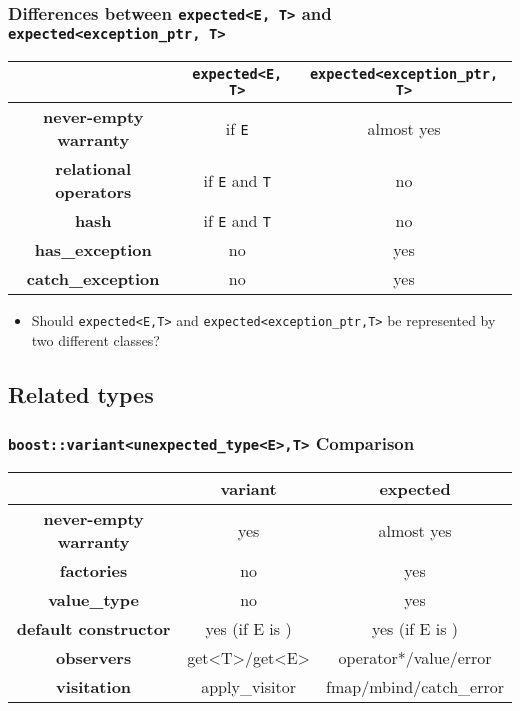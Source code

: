 \documentclass[xcolor=dvipsnames]{beamer}
\newcommand{\cpp}[1]{\lstinline{#1}}
\begin{document}
\begin{frame}[fragile]
\frametitle{Differences between \cpp{expected<E, T>} and \cpp{expected<exception_ptr, T>}}

\begin{tabular}{|c|c|c|}
\hline
                    & \cpp{expected<E, T>} & \cpp{expected<exception_ptr, T>}  \\
\hline
\textbf{never-empty warranty} & if \cpp{E} & almost yes \\
\hline
\textbf{relational operators} & if \cpp{E} and \cpp{T} & no \\
\hline
\textbf{hash} & if \cpp{E} and \cpp{T} & no \\
\hline
\textbf{has\_exception} & no & yes \\
\hline
\textbf{catch\_exception} & no & yes \\
\hline
\end{tabular}

\begin{itemize}
  \item Should \cpp{expected<E,T>} and \cpp{expected<exception_ptr,T>} be represented by two different classes?
\end{itemize}

\end{frame}
\subsection{Related types}
\begin{frame}[fragile]
\frametitle{\cpp{boost::variant<unexpected_type<E>,T>} Comparison}

\begin{tabular}{|c|c|c|}
\hline
                    & \textbf{variant} & \textbf{expected}  \\
\hline
\textbf{never-empty warranty} & yes & almost yes \\
\hline
\textbf{factories} & no & yes  \\
\hline
\textbf{value\_type} & no & yes  \\
\hline
\textbf{default constructor} & yes (if E is ) & yes (if E is )  \\
\hline
\textbf{observers} & get<T>/get<E> & operator*/value/error   \\
\hline
\textbf{visitation} & apply\_visitor & fmap/mbind/catch\_error  \\
\hline
\end{tabular}
\end{frame}
\end{document}
